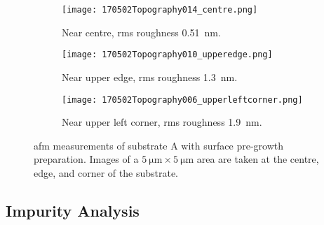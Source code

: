 \begin{figure}[htbp]
    \centering
    \begin{subfigure}[t]{\linewidth}
        \centering
        \texttt{[image: 170502Topography014\_centre.png]}
        \caption{Near centre, \ac{rms} roughness \SI{0.51}{\nano\metre}.} %
    \end{subfigure}%
    \par\bigskip
    \begin{subfigure}[t]{\linewidth}
        \centering
        \texttt{[image: 170502Topography010\_upperedge.png]}
        \caption{Near upper edge, \ac{rms} roughness \SI{1.3}{\nano\metre}.} %
    \end{subfigure}%
    \par\bigskip
    \begin{subfigure}[t]{\linewidth}
        \centering
        \texttt{[image: 170502Topography006\_upperleftcorner.png]}
        \caption{Near upper left corner, \ac{rms} roughness \SI{1.9}{\nano\metre}.}%
    \end{subfigure}%
    \caption[\Ac{afm} of substrate A with surface pre-growth preparation.]{\Acf{afm} measurements of substrate A with surface pre-growth preparation. Images of a $\SI{5}{\micro\metre}\times\SI{5}{\micro\metre}$ area are taken at the centre, edge, and corner of the substrate.}\label{fig:subAb_afm}
\end{figure} %

\subsection{Impurity Analysis}


